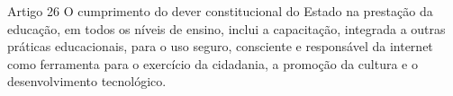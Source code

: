 \begin{frame}{Artigo 26}
O cumprimento do dever constitucional do Estado na prestação da educação, em todos os níveis de ensino, inclui a capacitação, integrada a outras práticas educacionais, para o uso seguro, consciente e responsável da internet como ferramenta para o exercício da cidadania, a promoção da cultura e o desenvolvimento tecnológico.
\end{frame}